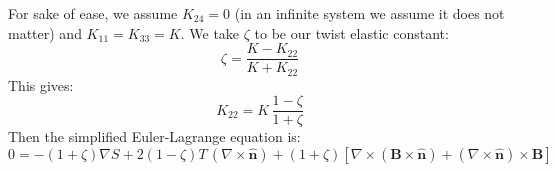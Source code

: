 \documentclass[reqno]{article}
\newcommand{\n}{\hat{\mathbf{n}}}
\begin{document}
For sake of ease, we assume $K_{24} = 0$ (in an infinite system we assume it does not matter) and $K_{11} = K_{33} = K$.
We take $\zeta$ to be our twist elastic constant:
\begin{equation}
    \zeta
    =
    \frac{K - K_{22}}{K + K_{22}}
\end{equation}
This gives:
\begin{equation}
    K_{22}
    =
    K \, \frac{1 - \zeta}{1 + \zeta}
\end{equation}
Then the simplified Euler-Lagrange equation is:
\begin{equation}
    0
    =
    -(1 + \zeta) \nabla S
    + 2 (1 - \zeta) T \, \left(\nabla \times \n\right)
    + (1 + \zeta) \left[ 
        \nabla \times \left( \mathbf{B} \times \n \right)
        + \left( \nabla \times \n \right) \times \mathbf{B}
    \right]
\end{equation}

\theendnotes
\end{document}
